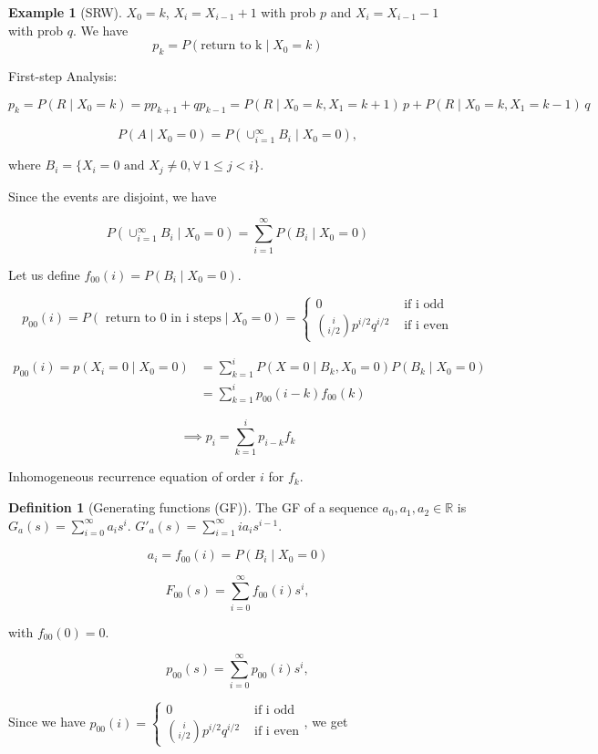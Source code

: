 \documentclass{article}
\theoremstyle{definition}
\newtheorem{exmp}{Example}[section]
\newtheorem{defn}{Definition}[section]
\begin{document}
\begin{exmp}[SRW]
$X_0 = k$, $X_i = X_{i-1} + 1$ with prob $p$ and $X_{i} = X_{i-1} -1$ with prob $q$.
We have
$$
p_k = P(\text{return to k} \mid X_0 = k)
$$

First-step Analysis:

$$
p_k = P(R \mid X_0 = k) = p p_{k+1} + q p_{k-1} = P(R \mid X_0 = k, X_1 = k+1) \, p + P(R \mid X_0 = k, X_1 = k-1) \, q
$$

$$
P(A \mid X_0 = 0) = P \left( \cup_{i=1}^\infty B_i \mid X_0 = 0 \right),
$$

where $B_i = \{ X_i = 0 \text{ and } X_j \ne 0, \forall \, 1 \le j < i\}$.

Since the events are disjoint, we have

$$
P \left( \cup_{i=1}^\infty B_i \mid X_0 = 0 \right) = \sum_{i=1}^\infty P(B_i \mid X_0 = 0)
$$

Let us define $f_{00}(i) =  P(B_i \mid X_0 = 0)$.

$$
p_{00}(i) = P(\text{ return to 0 in i steps} \mid X_0 = 0) = \begin{cases}
0 & \text{ if i odd} \\
{ i \choose i/2} p^{i/2} q^{i/2} & \text{ if i even}
\end{cases}
$$

\begin{align*}
p_{00}(i) = p(X_i = 0 \mid X_0 = 0)
&= \sum_{k=1}^i P(X=0 \mid B_k, X_0 = 0) P(B_k \mid X_0 = 0) \\
&=  \sum_{k=1}^i p_{00}(i-k) f_{00}(k)
\end{align*}

$$
\implies p_i = \sum_{k=1}^i p_{i-k} f_k
$$

Inhomogeneous recurrence equation of order $i$ for $f_k$.


\begin{defn}[Generating functions (GF)]
The GF of a sequence $a_0, a_1, a_2 \in \mathbb{R}$ is $G_a(s) = \sum_{i=0}^\infty a_i s^i$. $G'_a(s) = \sum_{i=1}^\infty i a_i s^{i-1}$.
\end{defn}

$$
a_i = f_{00}(i) = P(B_i \mid X_0 = 0)
$$

$$
F_{00}(s) = \sum_{i=0}^\infty f_{00}(i) s^i,
$$

with $f_{00}(0) = 0$.

$$
p_{00}(s) = \sum_{i=0}^\infty p_{00}(i) s^i,
$$

Since we have
$p_{00}(i)  = \begin{cases}
0 & \text{ if i odd} \\
{ i \choose i/2} p^{i/2} q^{i/2} & \text{ if i even}
\end{cases}$, we get


\end{exmp}
\end{document}
